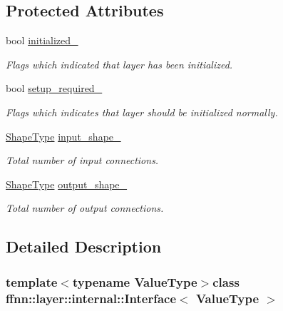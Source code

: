 \subsection*{Protected Attributes}
\begin{DoxyCompactItemize}
\item 
bool \hyperlink{classffnn_1_1layer_1_1internal_1_1_interface_a48c80e6608e9e20dfe2665abd55cd7ba}{initialized\-\_\-}
\begin{DoxyCompactList}\small\item\em Flags which indicated that layer has been initialized. \end{DoxyCompactList}\item 
bool \hyperlink{classffnn_1_1layer_1_1internal_1_1_interface_a57f0de55599c9b6621a66096b5662ca8}{setup\-\_\-required\-\_\-}
\begin{DoxyCompactList}\small\item\em Flags which indicates that layer should be initialized normally. \end{DoxyCompactList}\item 
\hyperlink{classffnn_1_1layer_1_1internal_1_1_interface_a945709b1d0ea54a51539b80d04485f5f}{Shape\-Type} \hyperlink{classffnn_1_1layer_1_1internal_1_1_interface_a3b9f183881a6aed198c566ecbf0177f7}{input\-\_\-shape\-\_\-}
\begin{DoxyCompactList}\small\item\em Total number of input connections. \end{DoxyCompactList}\item 
\hyperlink{classffnn_1_1layer_1_1internal_1_1_interface_a945709b1d0ea54a51539b80d04485f5f}{Shape\-Type} \hyperlink{classffnn_1_1layer_1_1internal_1_1_interface_aac8cae47508ba37964d11754e181813a}{output\-\_\-shape\-\_\-}
\begin{DoxyCompactList}\small\item\em Total number of output connections. \end{DoxyCompactList}\end{DoxyCompactItemize}


\subsection{Detailed Description}
\subsubsection*{template$<$typename Value\-Type$>$class ffnn\-::layer\-::internal\-::\-Interface$<$ Value\-Type $>$}

